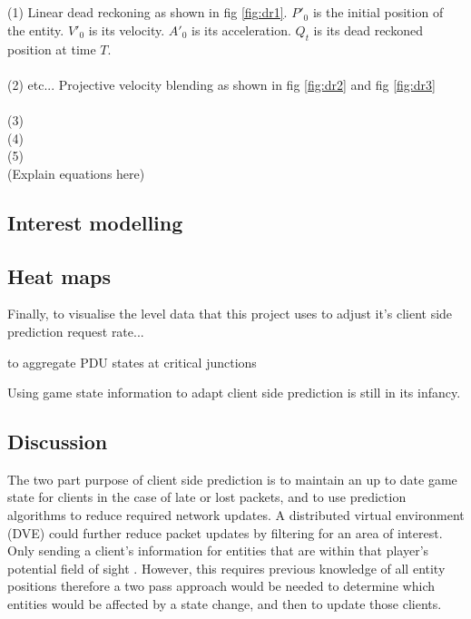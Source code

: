 \documentclass[journal]{IEEEtran}
\begin{document}
\cite{murphy2011believable} \\ \\
(1) Linear dead reckoning as shown in fig \ref{fig:dr1}. $P'_0$ is the initial position of the entity. $V'_0$ is its velocity. $A'_0$ is its acceleration. $Q_t$ is its dead reckoned position at time $T$.  \\ \\
(2) etc... Projective velocity blending as shown in fig \ref{fig:dr2} and fig \ref{fig:dr3} \\ \\
(3) \\
(4) \\
(5) \\

(Explain equations here)

\subsection{Interest modelling}

\cite{yahyavi2011antreckoning}

\cite{yahyavi2013interest}

\cite{yahyavi2013towards}

\cite{cai1999auto}

\cite{jaya2016combining}

\cite{larsson2016movement}

\subsection{Heat maps}

\cite{bauckhage2014beyond}

\cite{kuipers1978modeling}

Finally, to visualise the level data that this project uses to adjust it's client side prediction request rate...

to aggregate PDU states at critical junctions

Using game state information to adapt client side prediction is still in its infancy.


\subsection{Discussion}

The two part purpose of client side prediction is to maintain an up to date game state for clients in the case of late or lost packets, and to use prediction algorithms to reduce required network updates. A distributed virtual environment (DVE) could further reduce packet updates by filtering for an area of interest. Only sending a client's information for entities that are within that player’s potential field of sight \cite{cronin2001distributed}. However, this requires previous knowledge of all entity positions therefore a two pass approach would be needed to determine which entities would be affected by a state change, and then to update those clients.
\end{document}
